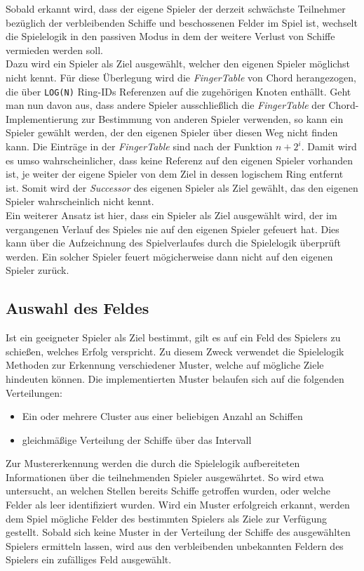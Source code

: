 Sobald erkannt wird, dass der eigene Spieler der derzeit schwächste Teilnehmer bezüglich der verbleibenden Schiffe und beschossenen Felder im Spiel ist, wechselt die Spielelogik in den passiven Modus in dem der weitere Verlust von Schiffe vermieden werden soll.\\
Dazu wird ein Spieler als Ziel ausgewählt, welcher den eigenen Spieler möglichst nicht kennt. Für diese Überlegung wird die \textit{FingerTable} von Chord herangezogen, die über \texttt{LOG(N)} Ring-IDs Referenzen auf die zugehörigen Knoten enthällt. Geht man nun davon aus, dass andere Spieler ausschließlich die \textit{FingerTable} der Chord-Implementierung zur Bestimmung von anderen Spieler verwenden, so kann ein Spieler gewählt werden, der den eigenen Spieler über diesen Weg nicht finden kann. Die Einträge in der \textit{FingerTable} sind nach der Funktion \( n+2^{i}\). Damit wird es umso wahrscheinlicher, dass keine Referenz auf den eigenen Spieler vorhanden ist, je weiter der eigene Spieler von dem Ziel in dessen logischem Ring entfernt ist. Somit wird der \textit{Successor} des eigenen Spieler als Ziel gewählt, das den eigenen Spieler wahrscheinlich nicht kennt.\\
Ein weiterer Ansatz ist hier, dass ein Spieler als Ziel ausgewählt wird, der im vergangenen Verlauf des Spieles nie auf den eigenen Spieler gefeuert hat. Dies kann über die Aufzeichnung des Spielverlaufes durch die Spielelogik überprüft werden. Ein solcher Spieler feuert mögicherweise dann nicht auf den eigenen Spieler zurück.\\

\subsection{Auswahl des Feldes}

Ist ein geeigneter Spieler als Ziel bestimmt, gilt es auf ein Feld des Spielers zu schießen, welches Erfolg verspricht. Zu diesem Zweck verwendet die Spielelogik Methoden zur Erkennung verschiedener Muster, welche auf mögliche Ziele hindeuten können. Die implementierten Muster belaufen sich auf die folgenden Verteilungen:\\

\begin{itemize}
\item Ein oder mehrere Cluster aus einer beliebigen Anzahl an Schiffen
\item gleichmäßige Verteilung der Schiffe über das Intervall
\end{itemize}

Zur Mustererkennung werden die durch die Spielelogik aufbereiteten Informationen über die teilnehmenden Spieler ausgewährtet. So wird etwa untersucht, an welchen Stellen bereits Schiffe getroffen wurden, oder welche Felder als leer identifiziert wurden. Wird ein Muster erfolgreich erkannt, werden dem Spiel mögliche Felder des bestimmten Spielers als Ziele zur Verfügung gestellt. Sobald sich keine Muster in der Verteilung der Schiffe des ausgewählten Spielers ermitteln lassen, wird aus den verbleibenden unbekannten Feldern des Spielers ein zufälliges Feld ausgewählt.\\

